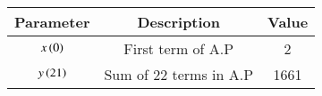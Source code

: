 \renewcommand{\arraystretch}{2}
\begin{tabular}{|c|c|c|}
\hline 
\setlength{\tabcolsep}{1pt}
\textbf{Parameter}  &\textbf{Description} &\textbf{Value} \\
\hline
$x\left(0\right)$ & First term of A.P & 2 \\
\hline
$y\left(21\right)$ & Sum of 22 terms in A.P & 1661 \\
\hline
\end{tabular}
